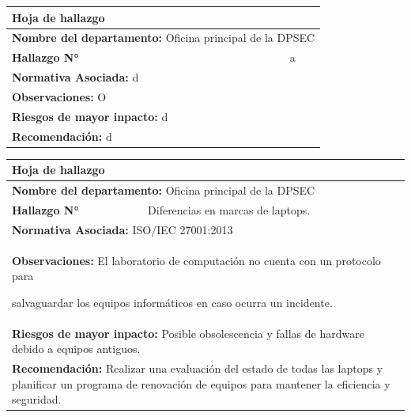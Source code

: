 \documentclass[12pt,a4paper]{article}
\begin{document}
\begin{tabular}{ |p{4cm}|p{4cm}|p{4cm}|  }
    \hline  
    \multicolumn{3}{|l|}{\textbf{Hoja de hallazgo}} \\
    \hline
    \multicolumn{3}{|l|}{\textbf{Nombre del departamento: } Oficina principal de la DPSEC} \\
    \hline
    \textbf{Hallazgo N° }  & \multicolumn{2}{|c|}{ a } \\
    \hline
    \multicolumn{3}{|l|}{\textbf{Normativa Asociada: } d } \\
    \hline
    \multicolumn{3}{|l|}{\textbf{Observaciones: } O} \\
    \hline
    \multicolumn{3}{|l|}{\textbf{Riesgos de mayor inpacto: } d } \\
    \hline
    \multicolumn{3}{|l|}{\textbf{Recomendación: } d } \\
    \hline
\end{tabular}
\par
\begin{table}[h!]
    \begin{tabular}{|p{2cm}|p{2cm}|p{2cm}|}
        \hline
        \multicolumn{3}{|l|}{\textbf{Hoja de hallazgo}} \\
        \hline
        \multicolumn{3}{|l|}{\textbf{Nombre del departamento: } Oficina principal de la DPSEC} \\
        \hline
        \textbf{Hallazgo N° }  & \multicolumn{2}{|l|}{ 	Diferencias en marcas de laptops. } \\
        \hline
        \multicolumn{3}{|l|}{\textbf{Normativa Asociada: } ISO/IEC 27001:2013 } \\
        \hline
        \multicolumn{3}{|l|}{\textbf{Observaciones: } El laboratorio de computación no cuenta con un protocolo para \par salvaguardar los equipos informáticos en caso ocurra un incidente.} \\
        \hline
        \multicolumn{3}{|l|}{\textbf{Riesgos de mayor inpacto: } Posible obsolescencia y fallas de hardware debido a equipos antiguos. } \\
        \hline
        \multicolumn{3}{|l|}{\textbf{Recomendación: } Realizar una evaluación del estado de todas las laptops y planificar un programa de renovación de equipos para mantener la eficiencia y seguridad. } \\
        \hline
    \end{tabular}
    \end{table}
    
\end{document}
